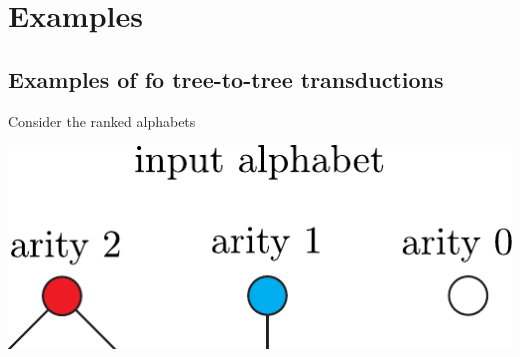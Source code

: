 \section{Examples}

\subsection{Examples of fo tree-to-tree transductions}\label{sec:appendix-example-fo-transductions}
\begin{example}\label{ex:pre-order}
    Consider the ranked alphabets
\begin{center}
    \includegraphics[scale=.4]{input-alphabet}
    

\end{center}
\end{example}
